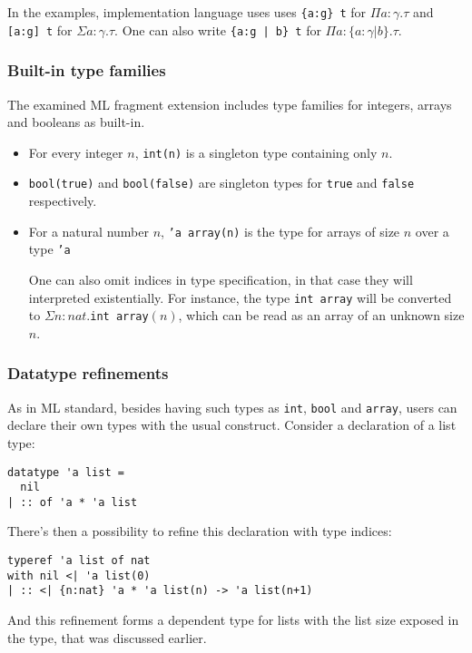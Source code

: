 \documentclass[a4paper,UKenglish]{lipics-v2016}
\begin{document}
In the examples, implementation language uses uses \texttt{\{a:g\} t} for $\Pi
a: \gamma. \tau$ and \texttt{[a:g] t} for $\Sigma a: \gamma. \tau$. One can
also write \texttt{\{a:g | b\} t} for $\Pi a: \{a: \gamma | b\}. \tau$.

\subsubsection{Built-in type families}

The examined ML fragment extension includes type families for integers, arrays
and booleans as built-in.

\begin{itemize}
  \item For every integer $n$, \texttt{int(n)} is a singleton type containing
    only $n$.
  \item \texttt{bool(true)} and \texttt{bool(false)} are singleton types for
    \texttt{true} and \texttt{false} respectively.
  \item For a natural number $n$, \texttt{'a array(n)} is the type for arrays
    of size $n$ over a type \texttt{'a}

    One can also omit indices in type specification, in that case they will
    interpreted existentially. For instance, the type \texttt{int array} will
    be converted to $\Sigma n : nat$.\texttt{int array}$(n)$, which can be read
    as an array of an unknown size $n$.
\end{itemize}

\subsubsection{Datatype refinements}

As in ML standard, besides having such types as \texttt{int}, \texttt{bool} and
\texttt{array}, users can declare their own types with the usual construct.
Consider a declaration of a list type:
\begin{verbatim}
datatype 'a list =
  nil
| :: of 'a * 'a list
\end{verbatim}

There's then a possibility to refine this declaration with type indices:
\begin{verbatim}
typeref 'a list of nat
with nil <| 'a list(0)
| :: <| {n:nat} 'a * 'a list(n) -> 'a list(n+1)
\end{verbatim}

And this refinement forms a dependent type for lists with the list size exposed
in the type, that was discussed earlier.
\end{document}

